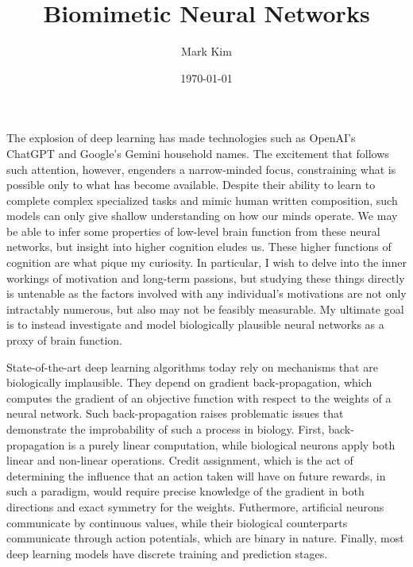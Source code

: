 \documentclass[12pt]{article}
\title{Biomimetic Neural Networks}
\author{Mark Kim}
\date{\today}
\begin{document}
\maketitle

The explosion of deep learning has made technologies such as OpenAI's ChatGPT
and Google's Gemini household names.  The excitement that follows such
attention, however, engenders a narrow-minded focus, constraining what is
possible only to what has become available.  Despite their ability
to learn to complete complex specialized tasks and mimic human written
composition, such models can only give shallow understanding on how our minds
operate. We may be able to infer some properties of low-level brain function
from these neural networks, but insight into higher cognition eludes us.  These higher
functions of cognition are what pique my curiosity.  In particular, I wish to
delve into the inner workings of motivation and long-term passions, but studying
these things directly is untenable as the factors involved with any individual's
motivations are not only intractably numerous, but also may not be feasibly
measurable.  My ultimate goal is to instead investigate and model biologically
plausible neural networks as a proxy of brain function.

State-of-the-art deep learning algorithms today rely on mechanisms that are
biologically implausible.  They depend on gradient back-propagation, which
computes the gradient of an objective function with respect to the weights of a
neural network.  Such back-propagation raises problematic issues that
demonstrate the improbability of such a process in biology.  First,
back-propagation is a purely linear computation, while biological neurons apply
both linear and non-linear operations. Credit assignment, which is the act of
determining the influence that an action taken will have on future rewards, in
such a paradigm, would require precise knowledge of the gradient in both
directions and exact symmetry for the weights.  Futhermore, artificial neurons
communicate by continuous values, while their biological counterparts
communicate through action potentials, which are binary in nature.  Finally,
most deep learning models have discrete training and prediction stages.
\end{document}
